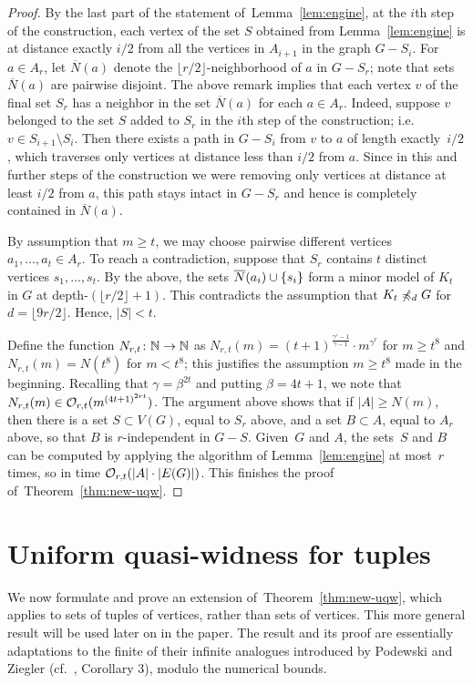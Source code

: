 \begin{proof}
By the last part of the statement of~Lemma~\ref{lem:engine}, at the
$i$th step of the construction, each vertex of the set $S$ obtained
from Lemma~\ref{lem:engine} is at distance exactly $i/2$ from all the
vertices in $A_{i+1}$ in the graph $G-S_i$.  For $a\in A_r$, let
$\overline{N}(a)$ denote the $\lfloor r/2\rfloor$-neighborhood of $a$
in $G-S_r$; note that sets~$\overline{N}(a)$ are pairwise disjoint.
The above remark implies that each vertex $v$ of the final set $S_r$
has a neighbor in the set $\overline{N}(a)$ for each $a\in A_r$.
Indeed, suppose $v$ belonged to the set $S$ added to $S_r$ in the
$i$th step of the construction; i.e. $v\in S_{i+1}\setminus S_i$.
Then there exists a path in $G-S_i$ from $v$ to $a$ of length
exactly~$i/2$, which traverses only vertices at distance less than
$i/2$ from $a$.  Since in this and further steps of the construction
we were removing only vertices at distance at least $i/2$ from $a$,
this path stays intact in $G-S_r$ and hence is completely contained in
$\overline{N}(a)$.

By assumption that $m\ge t$, we may choose pairwise different vertices
$a_1,\ldots,a_t\in A_r$.  To reach a contradiction, suppose that $S_r$
contains $t$ distinct vertices $s_1,\ldots,s_t$.  By the above, the
sets $\overline{N}(a_i)\cup\{s_i\}$ form a minor model of $K_t$ in
$G$ at depth-$(\lfloor r/2\rfloor+1)$.  This contradicts the
assumption that $K_t\not\preccurlyeq_d G$ for $d=\lfloor 9r/2 \rfloor$.
Hence, $|S|<t$.

Define the function $N_{r,t}\colon\mathbb{N}\to\mathbb{N}$ as
$N_{r,t}(m)=(t+1)^{\frac{\gamma^{r}-1}{\gamma-1}}\cdot m^{\gamma^{r}}$
for $m\ge t^8$ and $N_{r,t}(m)=N(t^8)$ for $m<t^8$; this justifies the
assumption $m\geq t^8$ made in the beginning.  Recalling that
$\gamma=\beta^{2t}$ and putting $\beta=4t+1$, we note that
$N_{r,t}(m)\in \mathcal{O}_{r,t}{(m^{{(4t+1)}^{2rt}})}$.  The argument above
shows that if $|A|\ge N(m)$, then there is a set $S\subset V(G)$,
equal to $S_r$ above, and a set $B\subset A$, equal to $A_r$ above, so
that $B$ is $r$-independent in $G-S$.  Given~$G$ and $A$, the sets~$S$
and $B$ can be computed by applying the algorithm of
Lemma~\ref{lem:engine} at most~$r$ times, so in time
$\mathcal{O}_{r,t}(|A|\cdot |E(G)|)$.  This finishes the proof
of~Theorem~\ref{thm:new-uqw}.
\end{proof}



\section{Uniform quasi-widness for tuples}\label{sec:uqw-tuples}
We now formulate and prove an extension of~Theorem~\ref{thm:new-uqw},
which applies to sets of tuples of vertices, rather than sets of
vertices.  This more general result will be used later on in the
paper.  The result and its proof are essentially adaptations to the
finite of their infinite analogues introduced by Podewski and Ziegler
(cf.~\cite{podewski1978stable}, Corollary 3), modulo the numerical
bounds.

